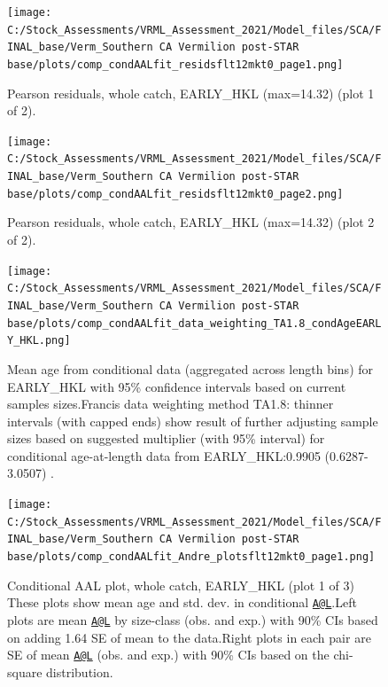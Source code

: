 \documentclass[
  english,
  a4paper,
]{article}
\begin{document}
\begin{figure}
\centering
\texttt{[image: C:/Stock\_Assessments/VRML\_Assessment\_2021/Model\_files/SCA/FINAL\_base/Verm\_Southern CA Vermilion post-STAR base/plots/comp\_condAALfit\_residsflt12mkt0\_page1.png]}
\caption{Pearson residuals, whole catch, EARLY\_HKL (max=14.32) (plot 1 of 2).\label{fig:comp_condAALfit_residsflt12mkt0_page1}}
\end{figure}

\begin{figure}
\centering
\texttt{[image: C:/Stock\_Assessments/VRML\_Assessment\_2021/Model\_files/SCA/FINAL\_base/Verm\_Southern CA Vermilion post-STAR base/plots/comp\_condAALfit\_residsflt12mkt0\_page2.png]}
\caption{Pearson residuals, whole catch, EARLY\_HKL (max=14.32) (plot 2 of 2).\label{fig:comp_condAALfit_residsflt12mkt0_page2}}
\end{figure}

\begin{figure}
\centering
\texttt{[image: C:/Stock\_Assessments/VRML\_Assessment\_2021/Model\_files/SCA/FINAL\_base/Verm\_Southern CA Vermilion post-STAR base/plots/comp\_condAALfit\_data\_weighting\_TA1.8\_condAgeEARLY\_HKL.png]}
\caption{Mean age from conditional data (aggregated across length bins) for EARLY\_HKL with 95\% confidence intervals based on current samples sizes.Francis data weighting method TA1.8: thinner intervals (with capped ends) show result of further adjusting sample sizes based on suggested multiplier (with 95\% interval) for conditional age-at-length data from EARLY\_HKL:0.9905 (0.6287-3.0507) .\label{fig:comp_condAALfit_data_weighting_TA1.8_condAgeEARLY_HKL}}
\end{figure}

\begin{figure}
\centering
\texttt{[image: C:/Stock\_Assessments/VRML\_Assessment\_2021/Model\_files/SCA/FINAL\_base/Verm\_Southern CA Vermilion post-STAR base/plots/comp\_condAALfit\_Andre\_plotsflt12mkt0\_page1.png]}
\caption{Conditional AAL plot, whole catch, EARLY\_HKL (plot 1 of 3)
These plots show mean age and std. dev. in conditional \href{mailto:A@L}{\nolinkurl{A@L}}.Left plots are mean \href{mailto:A@L}{\nolinkurl{A@L}} by size-class (obs. and exp.) with 90\% CIs based on adding 1.64 SE of mean to the data.Right plots in each pair are SE of mean \href{mailto:A@L}{\nolinkurl{A@L}} (obs. and exp.) with 90\% CIs based on the chi-square distribution.\label{fig:comp_condAALfit_Andre_plotsflt12mkt0_page1}}
\end{figure}
\end{document}
